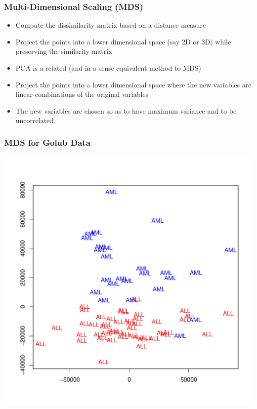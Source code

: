 \documentclass[xcolor=x11names,compress]{beamer}\usepackage[]{graphicx}\usepackage[]{color}
\newenvironment{knitrout}{}{} %
\begin{document}
\begin{frame}
  \frametitle{Multi-Dimensional Scaling (MDS)}
  \begin{itemize}
\item Compute the dissimilarity matrix based on a distance measure
\item Project the points into a lower dimensional space (say 2D or 3D) 
      while preserving the similarity matrix
\item PCA is a related (and in a sense equivalent method to MDS)
\item Project the points into a lower dimensional space where the new variables
      are linear combinations of the original variables
\item The new variables are chosen so as to have maximum variance and to be uncorrelated.
\end{itemize}
\end{frame}






\begin{frame}[containsverbatim]
  \frametitle{MDS for Golub Data}
\begin{knitrout}\tiny
{}\color{fgcolor}

{\centering \includegraphics[width=.6\linewidth]{figure/beamer-mdsgolub-1} 

}



\end{knitrout}
\end{frame}
\end{document}
